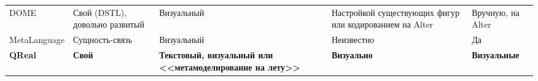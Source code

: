 \begin{table}[ht]
\begin{small}
\begin{longtabu} {| X[1 l p] | X[1 l p] | X[1 l p] | X[1 l p] |X[1 l p] |}
		DOME                         & Свой (DSTL), довольно развитый  & Визуальный                                                       & Настройкой существующих фигур или кодированием на Alter  & Вручную, на Alter                              \\
		MetaLanguage                 & Сущность-связь                  & Визуальный                                                       & Неизвестно                                               & Да                                             \\
		\textbf{QReal}               & \textbf{Свой}                   & \textbf{Текстовый, визуальный или <<метамоделирование на лету>>} & \textbf{Визуально}                                       & \textbf{Визуальные}                            
		\label{tab:existingPlatformsMain}
	\end{longtabu}
\end{small}
\end{table}

